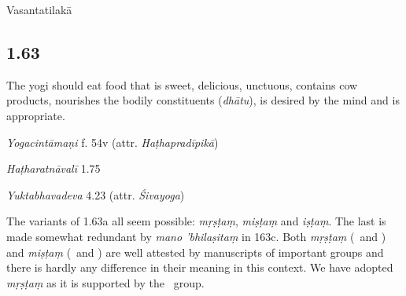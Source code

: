 \begin{ekdosis}
\begin{metre}[hp01_062]
Vasantatilakā 
\end{metre}

\subsection*{1.63}
\begin{translation}[hp01_063]
The yogi should eat food that is sweet, delicious, unctuous, contains cow products, nourishes the bodily constituents (\emph{dhātu}), is desired by the mind and is appropriate.
\end{translation}


\begin{testimonia}[hp01_063]

\emph{Yogacintāmaṇi} f. 54v (attr. \emph{Haṭhapradīpikā})

\begin{versinnote}
\end{versinnote}

\emph{Haṭharatnāvalī} 1.75

\begin{versinnote}
\end{versinnote}

\emph{Yuktabhavadeva} 4.23 (attr. \emph{Śivayoga})

\begin{versinnote}
\end{versinnote}

\end{testimonia}

\begin{philcomm}[hp01_063]
The variants of 1.63a all seem possible: \emph{mṛṣṭaṃ}, \emph{miṣṭaṃ} and \emph{iṣṭaṃ}. The last is made somewhat redundant by \emph{mano 'bhilaṣitaṃ} in 163c. Both \emph{mṛṣṭaṃ} (\textalpha\ and \texteta) and \emph{miṣṭaṃ} (\textbeta\ and \textgamma) are well attested by manuscripts of important groups and there is hardly any difference in their meaning in this context. We have adopted \emph{mṛṣṭaṃ} as it is supported by the \textalpha\ group.
\end{philcomm}


\end{ekdosis}

